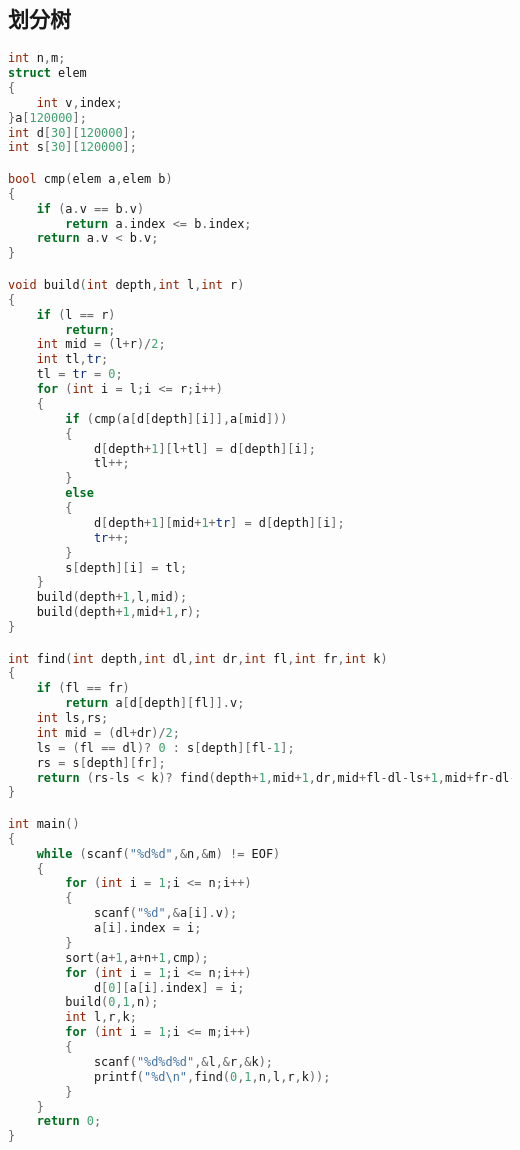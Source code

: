 \subsection{划分树}
    \begin{lstlisting}[language=c++]
int n,m;
struct elem
{
    int v,index;
}a[120000];
int d[30][120000];
int s[30][120000];

bool cmp(elem a,elem b)
{
    if (a.v == b.v)
        return a.index <= b.index;
    return a.v < b.v;
}

void build(int depth,int l,int r)
{
    if (l == r)
        return;
    int mid = (l+r)/2;
    int tl,tr;
    tl = tr = 0;
    for (int i = l;i <= r;i++)
    {
        if (cmp(a[d[depth][i]],a[mid]))
        {
            d[depth+1][l+tl] = d[depth][i];
            tl++;
        }
        else
        {
            d[depth+1][mid+1+tr] = d[depth][i];
            tr++;
        }
        s[depth][i] = tl;
    }
    build(depth+1,l,mid);
    build(depth+1,mid+1,r);
}

int find(int depth,int dl,int dr,int fl,int fr,int k)
{
    if (fl == fr)
        return a[d[depth][fl]].v;
    int ls,rs;
    int mid = (dl+dr)/2;
    ls = (fl == dl)? 0 : s[depth][fl-1];
    rs = s[depth][fr];
    return (rs-ls < k)? find(depth+1,mid+1,dr,mid+fl-dl-ls+1,mid+fr-dl-rs+1,k-(rs-ls)) : find(depth+1,dl,mid,dl+ls,dl+rs-1,k);
}

int main()
{
    while (scanf("%d%d",&n,&m) != EOF)
    {
        for (int i = 1;i <= n;i++)
        {
            scanf("%d",&a[i].v);
            a[i].index = i;
        }
        sort(a+1,a+n+1,cmp);
        for (int i = 1;i <= n;i++)
            d[0][a[i].index] = i;
        build(0,1,n);
        int l,r,k;
        for (int i = 1;i <= m;i++)
        {
            scanf("%d%d%d",&l,&r,&k);
            printf("%d\n",find(0,1,n,l,r,k));
        }
    }
    return 0;
}
    \end{lstlisting}